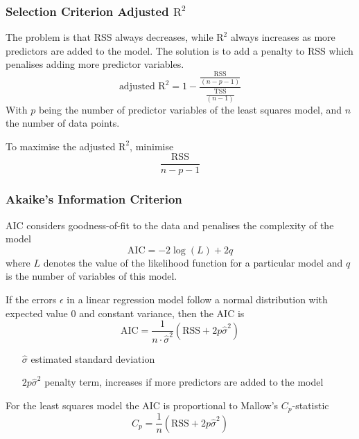 \documentclass[11pt]{article}
\begin{document}
\subsubsection{Selection Criterion Adjusted $\text{R}^2$}
The problem is that RSS always decreases, while $\text{R}^2$ always increases as more predictors are added to the model. The solution is to add a penalty to RSS which penalises adding more predictor variables.
\begin{equation*}
	\text{adjusted R}^2 = 1 - \frac{\frac{\text{RSS}}{(n-p-1)}}{\frac{\text{TSS}}{(n-1)}}
\end{equation*}
With $p$ being the number of predictor variables of the least squares model, and $n$ the number of data points.

To maximise the adjusted $\text{R}^2$, minimise
\begin{equation*}
	\frac{\text{RSS}}{n-p-1}
\end{equation*}

\subsubsection{Akaike's Information Criterion}
AIC considers goodness-of-fit to the data and penalises the complexity of the model
\begin{equation*}
	\text{AIC} = -2\log(L) + 2q
\end{equation*}
where $L$ denotes the value of the likelihood function for a particular model and $q$ is the number of variables of this model.

If the errors $\epsilon$ in a linear regression model follow a normal distribution with expected value $0$ and constant variance, then the AIC is
\begin{equation*}
	\text{AIC} = \frac{1}{n\cdot \hat{\sigma}^2} \left(\text{RSS} + 2p\hat{\sigma}^2\right)
\end{equation*}
\begin{itemize}[leftmargin=*, labelindent=1cm, labelsep=1cm]
	\item[$\hat{\sigma}$] estimated standard deviation
	\item[$2p\hat{\sigma}^2$] penalty term, increases if more predictors are added to the model
\end{itemize}
For the least squares model the AIC is proportional to Mallow's $C_p$-statistic
\begin{equation*}
	C_p = \frac{1}{n} (\text{RSS} + 2p\hat{\sigma}^2)
\end{equation*}
\end{document}
